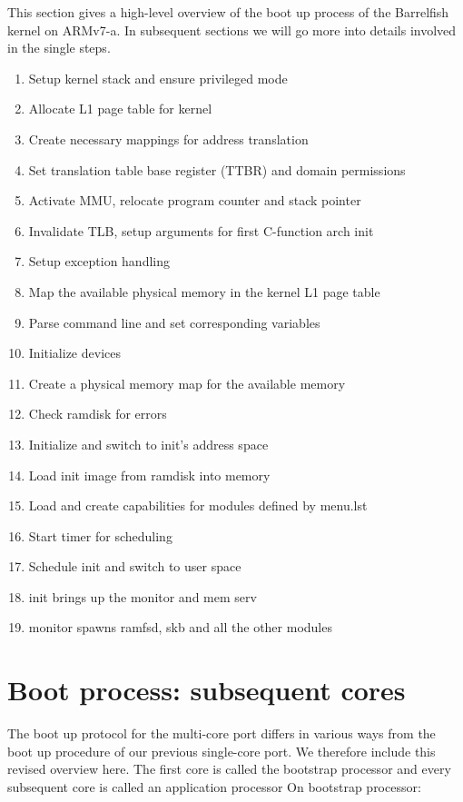 \documentclass[a4paper,twoside]{report} %
\begin{document}
This section gives a high-level overview of the boot up process of the
Barrelfish
kernel on ARMv7-a. In subsequent sections we will go more into details
involved
in the single steps.
\begin{enumerate}
\item Setup kernel stack and ensure privileged mode
\item Allocate L1 page table for kernel
\item Create necessary mappings for address translation
\item Set translation table base register (TTBR) and domain
  permissions
\item Activate MMU, relocate program counter and stack pointer
\item Invalidate TLB, setup arguments for first C-function arch init
\item Setup exception handling
\item Map the available physical memory in the kernel L1 page table
\item Parse command line and set corresponding variables
\item Initialize devices
\item Create a physical memory map for the available memory
\item Check ramdisk for errors
\item Initialize and switch to init’s address space
\item Load init image from ramdisk into memory
\item Load and create capabilities for modules defined by menu.lst
\item Start timer for scheduling
\item Schedule init and switch to user space
\item init brings up the monitor and mem serv
\item monitor spawns ramfsd, skb and all the other modules
\end{enumerate}

\section{Boot process: subsequent cores}


The boot up protocol for the multi-core port differs in various ways
from the boot up procedure of our previous single-core port. We
therefore include this revised overview here. The first core is called
the bootstrap processor and every subsequent core is called an
application processor On bootstrap processor:
\end{document}

